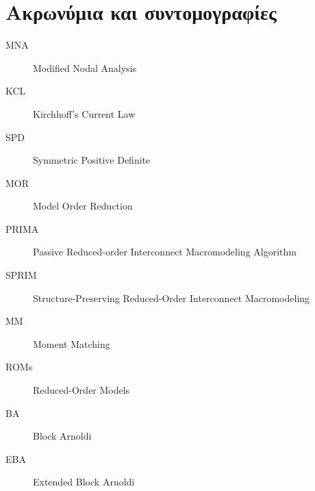 \chapter{Ακρωνύμια και συντομογραφίες}

\begin{description}
  \item[MNA] Modified Nodal Analysis
  \item[KCL] Kirchhoff’s Current Law
  \item[SPD] Symmetric Positive Definite
  \item[MOR] Model Order Reduction
  \item[PRIMA] Passive Reduced-order Interconnect Macromodeling Algorithm
  \item[SPRIM] Structure-Preserving Reduced-Order Interconnect Macromodeling
  \item[MM] Moment Matching
  \item[ROMs] Reduced-Order Models
  \item[BA] Block Arnoldi
  \item[EBA] Extended Block Arnoldi
\end{description}
